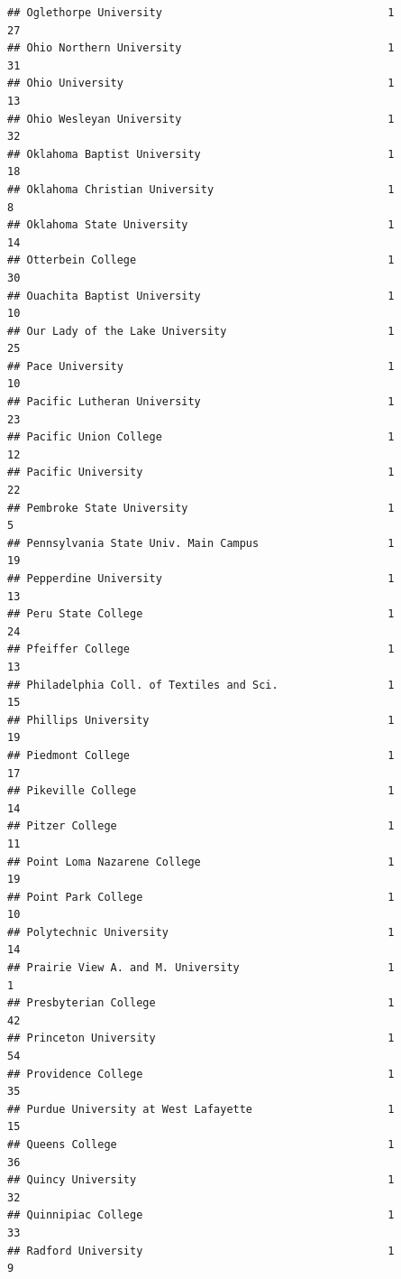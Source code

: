 \documentclass[
]{article}
\begin{document}
\begin{verbatim}
## Oglethorpe University                                   1          27
## Ohio Northern University                                1          31
## Ohio University                                         1          13
## Ohio Wesleyan University                                1          32
## Oklahoma Baptist University                             1          18
## Oklahoma Christian University                           1           8
## Oklahoma State University                               1          14
## Otterbein College                                       1          30
## Ouachita Baptist University                             1          10
## Our Lady of the Lake University                         1          25
## Pace University                                         1          10
## Pacific Lutheran University                             1          23
## Pacific Union College                                   1          12
## Pacific University                                      1          22
## Pembroke State University                               1           5
## Pennsylvania State Univ. Main Campus                    1          19
## Pepperdine University                                   1          13
## Peru State College                                      1          24
## Pfeiffer College                                        1          13
## Philadelphia Coll. of Textiles and Sci.                 1          15
## Phillips University                                     1          19
## Piedmont College                                        1          17
## Pikeville College                                       1          14
## Pitzer College                                          1          11
## Point Loma Nazarene College                             1          19
## Point Park College                                      1          10
## Polytechnic University                                  1          14
## Prairie View A. and M. University                       1           1
## Presbyterian College                                    1          42
## Princeton University                                    1          54
## Providence College                                      1          35
## Purdue University at West Lafayette                     1          15
## Queens College                                          1          36
## Quincy University                                       1          32
## Quinnipiac College                                      1          33
## Radford University                                      1           9

\end{verbatim}
\end{document}
